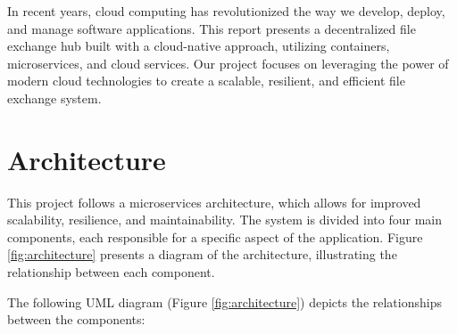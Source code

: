 \documentclass[a4paper,fleqn]{cas-dc}
\begin{document}
In recent years, cloud computing has revolutionized the way we develop, deploy, and manage software applications. This report presents a decentralized file exchange hub built with a cloud-native approach, utilizing containers, microservices, and cloud services. Our project focuses on leveraging the power of modern cloud technologies to create a scalable, resilient, and efficient file exchange system.

\section{Architecture}

This project follows a microservices architecture, which allows for improved scalability, resilience, and maintainability. The system is divided into four main components, each responsible for a specific aspect of the application. Figure \ref{fig:architecture} presents a diagram of the architecture, illustrating the relationship between each component.


The following UML diagram (Figure \ref{fig:architecture}) depicts the relationships between the components:
\end{document}
